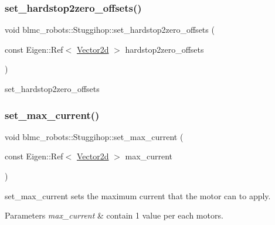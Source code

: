 \subsubsection{\texorpdfstring{set\+\_\+hardstop2zero\+\_\+offsets()}{set\_hardstop2zero\_offsets()}}
{\footnotesize\ttfamily void blmc\+\_\+robots\+::\+Stuggihop\+::set\+\_\+hardstop2zero\+\_\+offsets (\begin{DoxyParamCaption}\item[{const Eigen\+::\+Ref$<$ \hyperlink{common__header_8hpp_acb6916bc8c9fe9d98c484fd4cc201447}{Vector2d} $>$}]{hardstop2zero\+\_\+offsets }\end{DoxyParamCaption})}



set\+\_\+hardstop2zero\+\_\+offsets 

\mbox{\label{classblmc__robots_1_1Stuggihop_a8be641fdc498b04a52bb721f14c449c3}} 
\subsubsection{\texorpdfstring{set\+\_\+max\+\_\+current()}{set\_max\_current()}}
{\footnotesize\ttfamily void blmc\+\_\+robots\+::\+Stuggihop\+::set\+\_\+max\+\_\+current (\begin{DoxyParamCaption}\item[{const Eigen\+::\+Ref$<$ \hyperlink{common__header_8hpp_acb6916bc8c9fe9d98c484fd4cc201447}{Vector2d} $>$}]{max\+\_\+current }\end{DoxyParamCaption})\hspace{0.3cm}{\ttfamily [inline]}}



set\+\_\+max\+\_\+current sets the maximum current that the motor can to apply. 


\begin{DoxyParams}{Parameters}
{\em max\+\_\+current} & contain 1 value per each motors. \\
\hline
\end{DoxyParams}
\mbox{\label{classblmc__robots_1_1Stuggihop_afb35c29fd6e5eb97337857fd34532a6d}} 
